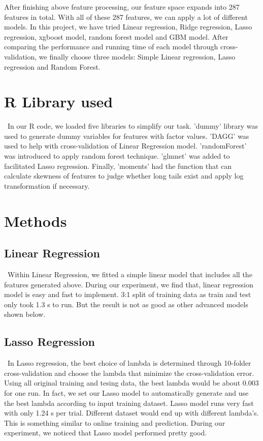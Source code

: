 \documentclass[12pt]{article}
\begin{document}
After finishing above feature processing, our feature space expands into 287 features in total. With all of these 287 features, we can apply a lot of different models. In this project, we have tried Linear regression, Ridge regression, Lasso regression, xgboost model, random forest model and GBM model. After comparing the performance and running time of each model through cross-validation, we finally choose three models: Simple Linear regression, Lasso regression and Random Forest.

\section{R Library used}
\quad\ In our R code, we loaded five libraries to simplify our task. 'dummy' library was used to generate dummy variables for features with factor values. 'DAGG' was used to help with cross-validation of Linear Regression model. 'randomForest' was introduced to apply random forest technique. 'glmnet' was added to facilitated Lasso regression. Finally, 'moments' had the function that can calculate skewness of features to judge whether long tails exist and apply log transformation if necessary.

\section{Methods}

\subsection{Linear Regression}
\quad\ Within Linear Regression, we fitted a simple linear model that includes all the features generated above. During our experiment, we find that, linear regression model is easy and fast to implement. 3:1 split of training data as train and test only took 1.3 s to run. But the result is not as good as other advanced models shown below.

\subsection{Lasso Regression}
\quad\ In Lasso regression, the best choice of lambda is determined through 10-folder cross-validation and choose the lambda that minimize the cross-validation error. Using all original training and tesing data, the best lambda would be about 0.003 for one run. In fact, we set our Lasso model to automatically generate and use the best lambda according to input training dataset. Lasso model runs very fast with only 1.24 s per trial. Different dataset would end up with different lambda's. This is something similar to online training and prediction. During our experiment, we noticed that Lasso model performed pretty good.
\end{document}
